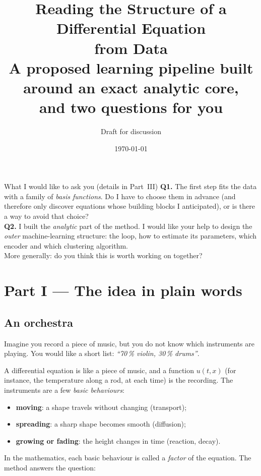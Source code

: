 \documentclass[11pt,a4paper]{article}
\title{\textbf{Reading the Structure of a Differential Equation\\ from Data}\\[3pt]
\large A proposed learning pipeline built around an exact analytic core,\\ and two questions for you}
\author{Draft for discussion}
\date{\today}
\begin{document}
\maketitle

\begin{askbox}{What I would like to ask you (details in Part~III)}
\textbf{Q1.} The first step fits the data with a family of \emph{basis functions}. Do I have to choose them in advance (and therefore only discover equations whose building blocks I anticipated), or is there a way to avoid that choice?\\[2pt]
\textbf{Q2.} I built the \emph{analytic} part of the method. I would like your help to design the \emph{outer} machine-learning structure: the loop, how to estimate its parameters, which encoder and which clustering algorithm.\\[2pt]
More generally: do you think this is worth working on together?
\end{askbox}

\tableofcontents

\section*{Part I --- The idea in plain words}

\subsection*{An orchestra}
Imagine you record a piece of music, but you do not know which instruments are playing. You would like a short list: \emph{``70\,\% violin, 30\,\% drums''}.

A differential equation is like a piece of music, and a function $u(t,x)$ (for instance, the temperature along a rod, at each time) is the recording. The instruments are a few \emph{basic behaviours}:
\begin{itemize}[nosep]
\item \textbf{moving}: a shape travels without changing (transport);
\item \textbf{spreading}: a sharp shape becomes smooth (diffusion);
\item \textbf{growing or fading}: the height changes in time (reaction, decay).
\end{itemize}
In the mathematics, each basic behaviour is called a \emph{factor} of the equation. The method answers the question:
\end{document}
